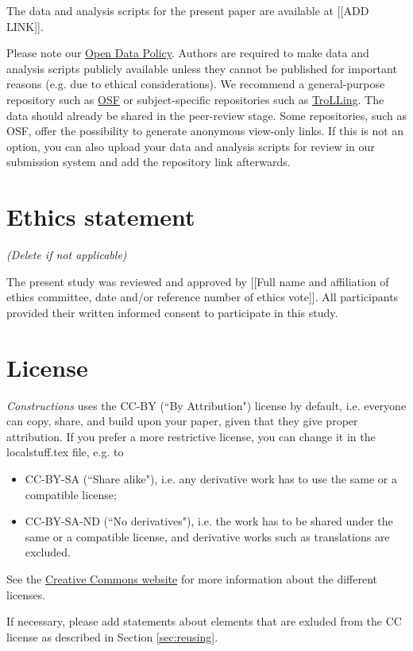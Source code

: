 \documentclass[]{constructions}
\begin{document}
The data and analysis scripts for the present paper are available at [[ADD LINK]].

\vspace{5pt}
\noindent Please note our \href{https://constructions.journals.hhu.de/about}{Open Data Policy}. Authors are required to make data and analysis scripts publicly available unless they cannot be published for important reasons (e.g. due to ethical considerations). We recommend a general-purpose repository such as \href{https://osf.io/}{OSF} or subject-specific repositories such as \href{https://dataverse.no/dataverse/trolling}{TroLLing}. The data should already be shared in the peer-review stage. Some repositories, such as OSF, offer the possibility to generate anonymous view-only links. If this is not an option, you can also upload your data and analysis scripts for review in our submission system and add the repository link afterwards.

\section*{Ethics statement}
\textit{(Delete if not applicable)}

\noindent The present study was reviewed and approved by [[Full name and affiliation of ethics committee, date and/or reference number of ethics vote]]. All participants provided their written informed consent to participate in this study.

\section*{License}
\doclicenseIcon \doclicenseText
\vspace{11pt}

\noindent \textit{Constructions} uses the CC-BY (``By Attribution") license by default, i.e. everyone can copy, share, and build upon your paper, given that they give proper attribution. If you prefer a more restrictive license, you can change it in the localstuff.tex file, e.g. to
\begin{itemize}
    \item CC-BY-SA (``Share alike"), i.e. any derivative work has to use the same or a compatible license;
    \item CC-BY-SA-ND (``No derivatives"), i.e. the work has to be shared under the same or a compatible license, and derivative works such as translations are excluded.
\end{itemize}

\noindent See the \href{https://creativecommons.org/}{Creative Commons website} for more information about the different licenses.

If necessary, please add statements about elements that are exluded from the CC license as described in Section \ref{sec:reusing}.


\end{document}
